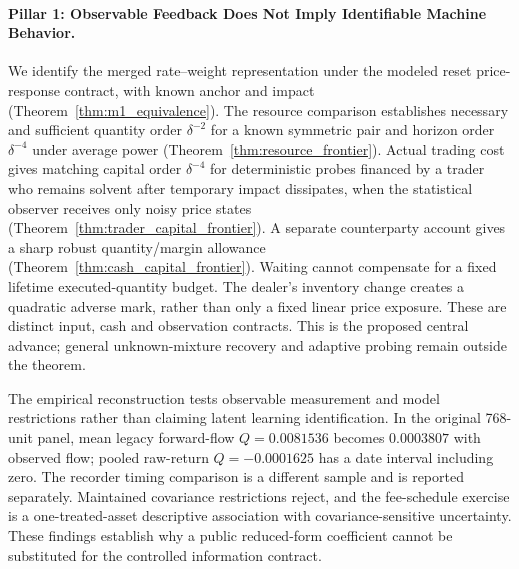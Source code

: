 \documentclass[12pt]{article}
\theoremstyle{definition}
\theoremstyle{remark}
\begin{document}
\paragraph{Pillar 1: Observable Feedback Does Not Imply Identifiable Machine Behavior.}
We identify the merged rate--weight representation under the modeled reset price-response contract, with known anchor and impact (Theorem~\ref{thm:m1_equivalence}). The resource comparison establishes necessary and sufficient quantity order $\delta^{-2}$ for a known symmetric pair and horizon order $\delta^{-4}$ under average power (Theorem~\ref{thm:resource_frontier}). Actual trading cost gives matching capital order $\delta^{-4}$ for deterministic probes financed by a trader who remains solvent after temporary impact dissipates, when the statistical observer receives only noisy price states (Theorem~\ref{thm:trader_capital_frontier}). A separate counterparty account gives a sharp robust quantity/margin allowance (Theorem~\ref{thm:cash_capital_frontier}). Waiting cannot compensate for a fixed lifetime executed-quantity budget. The dealer's inventory change creates a quadratic adverse mark, rather than only a fixed linear price exposure. These are distinct input, cash and observation contracts. This is the proposed central advance; general unknown-mixture recovery and adaptive probing remain outside the theorem.

The empirical reconstruction tests observable measurement and model restrictions rather than claiming latent learning identification. In the original 768-unit panel, mean legacy forward-flow $Q=0.0081536$ becomes $0.0003807$ with observed flow; pooled raw-return $Q=-0.0001625$ has a date interval including zero. The recorder timing comparison is a different sample and is reported separately. Maintained covariance restrictions reject, and the fee-schedule exercise is a one-treated-asset descriptive association with covariance-sensitive uncertainty. These findings establish why a public reduced-form coefficient cannot be substituted for the controlled information contract.
\end{document}
